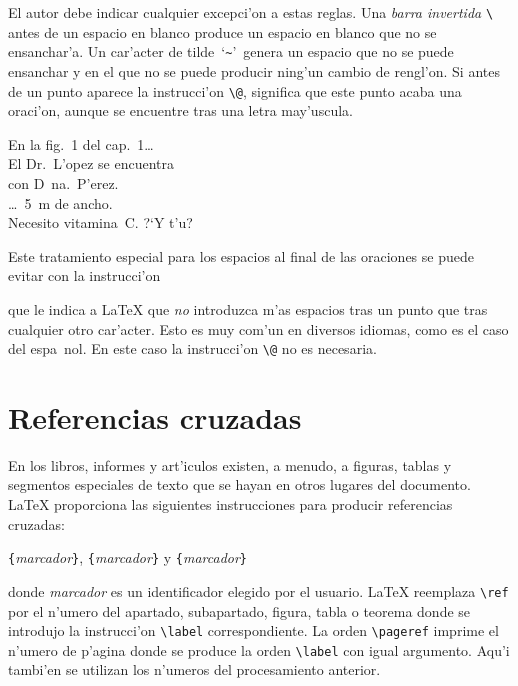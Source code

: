 El autor debe indicar cualquier excepci'on a estas reglas. Una
\emph{barra invertida} \verb|\| antes de un espacio en blanco produce
un espacio en blanco que no se ensanchar'a. Un car'acter de
tilde~`\verb|~|'\ genera un espacio que no se puede ensanchar y en el
que no se puede producir ning'un cambio de rengl'on. Si antes de un
punto aparece la instrucci'on \verb|\@|, significa que este punto
acaba una oraci'on, aunque se encuentre tras una letra may'uscula.
   

\begin{example}
En la fig.\ 1 del cap.\ 1\dots \\
El Dr.~L'opez se encuentra \\
con D~na.~P'erez. \\
\dots\ 5~m de ancho. \\
Necesito vitamina~C\@. ?`Y t'u?
\end{example}

Este tratamiento especial para los espacios al final de las oraciones
se puede evitar con la instrucci'on
\begin{command}
\end{command}
\noindent que le indica a \LaTeX{} que \emph{no} introduzca m'as
espacios tras un punto que tras cualquier otro car'acter. Esto es muy
com'un en diversos idiomas, como es el caso del espa~nol. En este caso
la instrucci'on \verb|\@| no es necesaria.




\section{Referencias cruzadas}

En los libros, informes y art'iculos existen, a menudo,
 a figuras, tablas y segmentos especiales de
texto que se hayan en otros lugares del documento. \LaTeX{}
proporciona las siguientes instrucciones para producir referencias
cruzadas:
\begin{command}
  \verb|{|\emph{marcador}\verb|}|,
  \verb|{|\emph{marcador}\verb|}| y
  \verb|{|\emph{marcador}\verb|}|
\end{command}
\noindent donde \emph{marcador} es un identificador elegido por el
usuario. \LaTeX{} reemplaza \verb|\ref| por el n'umero del apartado,
subapartado, figura, tabla o teorema donde se introdujo la
instrucci'on \verb|\label| correspondiente. La orden \verb|\pageref|
imprime el n'umero de p'agina donde se produce la orden \verb|\label|
con igual argumento. Aqu'i tambi'en se utilizan los n'umeros del
procesamiento anterior.

